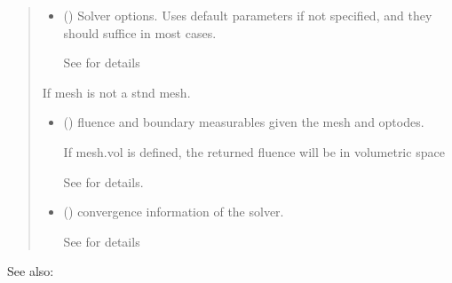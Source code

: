 \documentclass[letterpaper,10pt,english]{sphinxmanual}
\begin{document}
\begin{fulllineitems}
\begin{quote}
\begin{description}
\begin{itemize}
\item {} 
\sphinxAtStartPar
{} ({\hyperref[\detokenize{_autosummary/nirfasterff.utils.SolverOptions:nirfasterff.utils.SolverOptions}]{}}\sphinxstyleliteralemphasis{\sphinxupquote{, }}) \textendash{} 
\sphinxAtStartPar
Solver options. Uses default parameters if not specified, and they should suffice in most cases.

\sphinxAtStartPar
See {\hyperref[\detokenize{_autosummary/nirfasterff.utils.SolverOptions:nirfasterff.utils.SolverOptions}]{}} for details


\end{itemize}

\sphinxAtStartPar
{} \textendash{} If mesh is not a stnd mesh.

\sphinxAtStartPar
\begin{itemize}
\item {} 
\sphinxAtStartPar
{} () \textendash{} fluence and boundary measurables given the mesh and optodes.

\sphinxAtStartPar
If mesh.vol is defined, the returned fluence will be in volumetric space

\sphinxAtStartPar
See {\hyperref[\detokenize{_autosummary/nirfasterff.base.data.FDdata:nirfasterff.base.data.FDdata}]{}} for details.

\item {} 
\sphinxAtStartPar
{} () \textendash{} convergence information of the solver.

\sphinxAtStartPar
See {\hyperref[\detokenize{_autosummary/nirfasterff.utils.ConvergenceInfo:nirfasterff.utils.ConvergenceInfo}]{}} for details

\end{itemize}


\end{description}\end{quote}


\begin{sphinxseealso}{See also:}


\end{sphinxseealso}
\end{fulllineitems}
\end{document}
